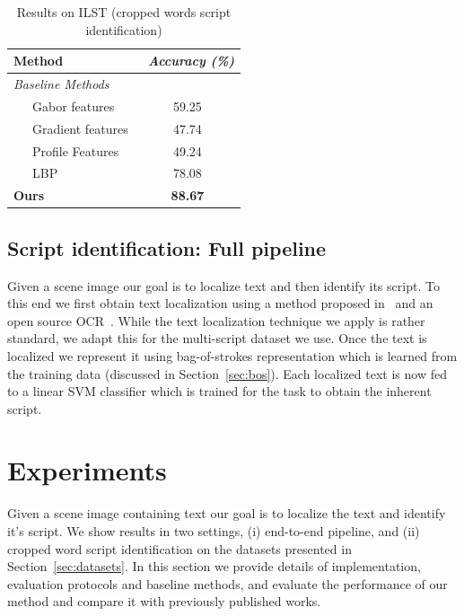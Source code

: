 \begin{table}[!t]
\caption{Results on ILST (cropped words script identification)} 
\centering
\renewcommand{\arraystretch}{1.5}
\begin{tabular}{|l|c|}
  \hline              
  \textbf{Method} &~\emph{\textbf{Accuracy} (\%)}   \\      
  \hline\hline
\textit{Baseline Methods} & \\
~~~Gabor features~\cite{Pati} & 59.25 \\ 
~~~Gradient features & 47.74 \\ 
~~~Profile Features~\cite{Manmatha12} & 49.24 \\
~~~LBP~\cite{LBPOjala2002} & 78.08\\
\hline\hline
\textbf{Ours} & \textbf{88.67} \\
  \hline  
\end{tabular}
\label{tab:ILSTRes1} 
\end{table}

\subsection{Script identification: Full pipeline}
Given a scene image our goal is to localize text and then identify its script.
To this end we first obtain text localization using a method proposed in~\cite{GomezK14}
and an open source OCR~\cite{tessOCR}. While the text localization technique we apply is rather standard, we adapt this for the multi-script dataset we use. 
Once the text is localized we represent it using bag-of-strokes representation which is learned from the training data (discussed in Section~\ref{sec:bos}). Each localized
text is now fed to a linear SVM classifier which is trained for the task to obtain the inherent script.

\section{Experiments}
\label{sec:expts}
Given a scene image containing text our goal is to localize the text and identify it's script. We show results in two settings, (i) end-to-end pipeline, and (ii) cropped word script identification on the datasets presented in Section~\ref{sec:datasets}.
In this section we provide details of implementation, evaluation protocols and baseline methods, and evaluate the performance of our method and compare it with previously published works.

